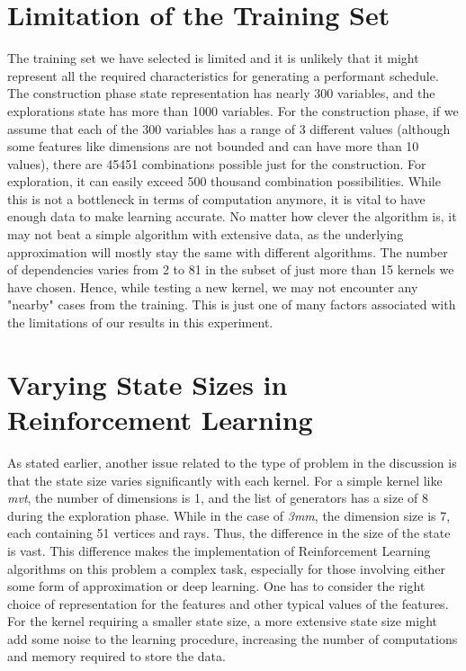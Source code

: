 \documentclass[logo,msc]{infthesis}           %
\begin{document}
\section{Limitation of the Training Set}
The training set we have selected is limited and it is unlikely that it might represent all the required characteristics for generating a performant schedule. The construction phase state representation has nearly 300 variables, and the explorations state has more than 1000 variables. For the construction phase, if we assume that each of the 300 variables has a range of 3 different values (although some features like dimensions are not bounded and can have more than 10 values), there are 45451 combinations possible just for the construction. For exploration, it can easily exceed 500 thousand combination possibilities. While this is not a bottleneck in terms of computation anymore, it is vital to have enough data to make learning accurate. No matter how clever the algorithm is, it may not beat a simple algorithm with extensive data, as the underlying approximation will mostly stay the same with different algorithms. The number of dependencies varies from 2 to 81 in the subset of just more than 15 kernels we have chosen. Hence, while testing a new kernel, we may not encounter any "nearby" cases from the training. This is just one of many factors associated with the limitations of our results in this experiment. 

\section{Varying State Sizes in Reinforcement Learning}
As stated earlier, another issue related to the type of problem in the discussion is that the state size varies significantly with each kernel. For a simple kernel like \textit{mvt}, the number of dimensions is 1, and the list of generators has a size of 8 during the exploration phase. While in the case of \textit{3mm}, the dimension size is 7, each containing 51 vertices and rays. Thus, the difference in the size of the state is vast. This difference makes the implementation of Reinforcement Learning algorithms on this problem a complex task, especially for those involving either some form of approximation or deep learning. One has to consider the right choice of representation for the features and other typical values of the features. For the kernel requiring a smaller state size, a more extensive state size might add some noise to the learning procedure, increasing the number of computations and memory required to store the data.
\end{document}
